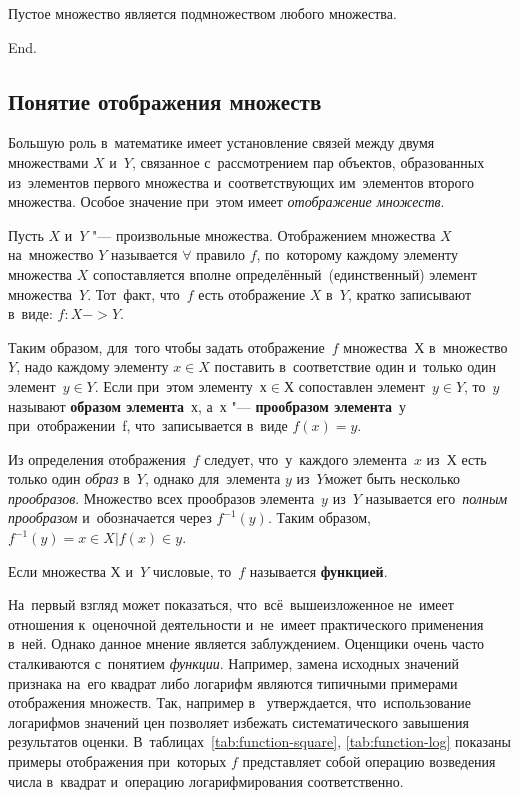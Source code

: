 \documentclass[]{scrartcl}
\begin{document}
\begin{theorem}
	Пустое множество является подмножеством любого множества.
\end{theorem}
End.\cite{Studopedia:mnozhestvo}
\subsection{Понятие отображения множеств}
Большую роль в~математике имеет установление связей между двумя множествами $X$ и~$Y$, связанное с~рассмотрением пар объектов, образованных из~элементов первого множества и~соответствующих им~элементов второго множества. Особое значение при~этом имеет \emph{отображение множеств}.

Пусть $X$ и~$Y$ "--- произвольные множества. Отображением множества $X$ на~множество $Y$ называется $\forall$ правило $f$, по~которому каждому элементу множества $X$ сопоставляется вполне определённый~(единственный) элемент множества~$Y$. Тот~факт, что~$f$ есть отображение $X$ в~$Y$, кратко записывают в~виде: $f:X->Y$.

Таким образом, для~того чтобы задать отображение~$f$ множества~$Х$ в~множество $Y$, надо каждому элементу $x\in X$ поставить в~соответствие один и~только один элемент~$y \in Y$. Если при~этом элементу~$х \in Х$ сопоставлен элемент~$y \in Y$, то~$y$ называют \textbf{образом элемента}~$х$, а~$х$ "--- \textbf{прообразом элемента}~у при~отображении~f, что~записывается в~виде $f(x)=y$.

Из определения отображения~$f$ следует, что~у~каждого элемента~$x$ из~$Х$ есть только один \emph{образ} в~$Y$, однако для~элемента $y$ из~$Y$может быть несколько \emph{прообразов}. Множество всех прообразов элемента~$y$ из~$Y$ называется его~\emph{полным прообразом} и~обозначается через $f^{-1}(y)$. Таким образом, $f^{-1}(y)={x \in X | f(x) \in y}$.

Если множества $Х$ и~$Y$ числовые, то~$f$ называется \textbf{функцией}.

На~первый взгляд может показаться, что~всё~вышеизложенное не~имеет отношения к~оценочной деятельности и~не~имеет практического применения в~ней. Однако данное мнение является заблуждением. Оценщики очень часто сталкиваются с~понятием \emph{функции}. Например, замена исходных значений признака на~его квадрат либо логарифм являются типичными примерами отображения множеств. Так, например в~\cite{Laskin:lognorm} утверждается, что~использование логарифмов значений цен позволяет избежать систематического завышения результатов оценки. В~таблицах~\ref{tab:function-square}, \ref{tab:function-log} показаны примеры отображения при~которых $f$ представляет собой операцию возведения числа в~квадрат и~операцию логарифмирования соответственно.
\end{document}
